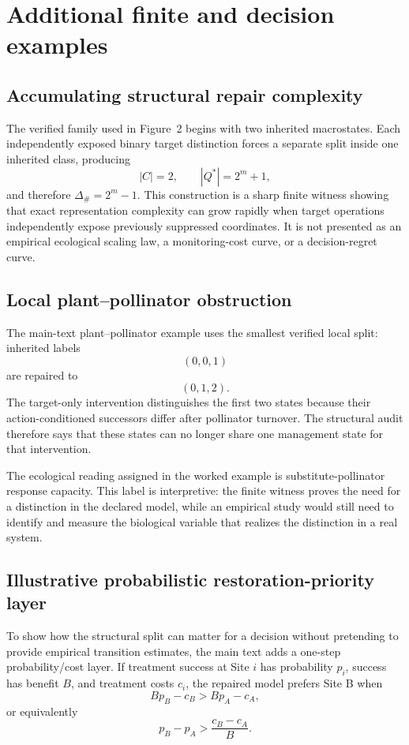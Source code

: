 \section{Additional finite and decision examples}

\subsection{Accumulating structural repair complexity}
The verified family used in Figure~2 begins with two inherited macrostates. Each independently exposed binary target distinction forces a separate split inside one inherited class, producing
\[
|C|=2,\qquad |Q^\ast|=2^m+1,
\]
and therefore $\Delta_{\#}=2^m-1$. This construction is a sharp finite witness showing that exact representation complexity can grow rapidly when target operations independently expose previously suppressed coordinates. It is not presented as an empirical ecological scaling law, a monitoring-cost curve, or a decision-regret curve.

\subsection{Local plant--pollinator obstruction}
The main-text plant--pollinator example uses the smallest verified local split: inherited labels
\[
(0,0,1)
\]
are repaired to
\[
(0,1,2).
\]
The target-only intervention distinguishes the first two states because their action-conditioned successors differ after pollinator turnover. The structural audit therefore says that these states can no longer share one management state for that intervention.

The ecological reading assigned in the worked example is substitute-pollinator response capacity. This label is interpretive: the finite witness proves the need for a distinction in the declared model, while an empirical study would still need to identify and measure the biological variable that realizes the distinction in a real system.

\subsection{Illustrative probabilistic restoration-priority layer}
To show how the structural split can matter for a decision without pretending to provide empirical transition estimates, the main text adds a one-step probability/cost layer. If treatment success at Site $i$ has probability $p_i$, success has benefit $B$, and treatment costs $c_i$, the repaired model prefers Site B when
\[
Bp_B-c_B>Bp_A-c_A,
\]
or equivalently
\[
p_B-p_A>\frac{c_B-c_A}{B}.
\]

